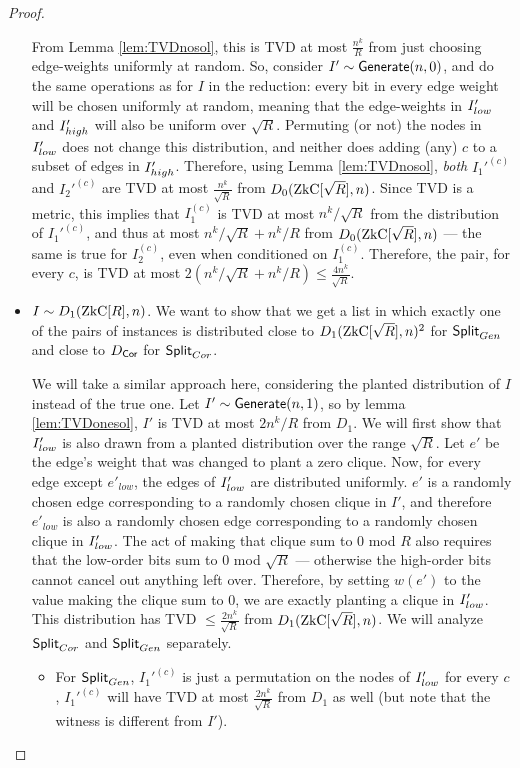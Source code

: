 \begin{proof}
\begin{itemize}
		From Lemma \ref{lem:TVDnosol}, this is TVD at most $\frac {n^k}{R}$ from just choosing edge-weights uniformly at random. So, consider $I' \sim \mathsf{Generate}(n,0)$, and do the same operations as for $I$ in the reduction: every bit in every edge weight will be chosen uniformly at random, meaning that the edge-weights in $I_{low}'$ and $I_{high}'$ will also be uniform over $\sqrt R$. Permuting (or not) the nodes in $I_{low}'$ does not change this distribution, and neither does adding (any) $c$ to a subset of edges in $I_{high}'$. Therefore, using Lemma \ref{lem:TVDnosol}, \emph{both} $I_1'^{(c)}$ and $I_2'^{(c)}$ are TVD at most $\frac{n^k}{\sqrt R}$ from $D_0(\ZkC[\sqrt R], n)$. Since TVD is a metric, this implies that $I_1^{(c)}$ is TVD at most $n^k / \sqrt R$ from the distribution of $I_1'^{(c)}$, and thus at most $n^k / \sqrt R + n^k/ R$ from $D_0(\ZkC[\sqrt R], n)$ --- the same is true for $I_2^{(c)}$, even when conditioned on $I_1^{(c)}$. Therefore, the pair, for every $c$, is TVD at most $2(n^k / \sqrt R + n^k/ R) \le \frac{4 n^k}{\sqrt R}$.
		
		
		\item $I \sim D_1(\ZkC[R], n)$. We want to show that we get a list in which exactly one of the pairs of instances is distributed close to $D_1(\ZkC[\sqrt R], n)^2$ for $\mathsf{Split}_{Gen}$ and close to $D_{\mathsf{Cor}}$ for $\mathsf{Split}_{Cor}$.
		
		We will take a similar approach here, considering the planted distribution of $I$ instead of the true one. Let $I' \sim \mathsf{Generate}(n,1)$, so by lemma \ref{lem:TVDonesol}, $I'$ is TVD at most $2n^k/R$ from $D_1$. We will first show that $I_{low}'$ is also drawn from a planted distribution over the range $\sqrt R$.
		Let $e'$ be the edge's weight that was changed to plant a zero clique. Now, for every edge except $e'_{low}$, the edges of $I_{low}'$ are distributed uniformly. $e'$ is a randomly chosen edge corresponding to a randomly chosen clique in $I'$, and therefore $e'_{low}$ is also a randomly chosen edge corresponding to a randomly chosen clique in $I_{low}'$. The act of making that clique sum to 0 mod $R$ also requires that the low-order bits sum to $0$ mod $\sqrt R$ --- otherwise the high-order bits cannot cancel out anything left over. Therefore, by setting $w(e')$ to the value making the clique sum to 0, we are exactly planting a clique in $I_{low}'$. This distribution has TVD $\le \frac{2n^k}{\sqrt R}$ from $D_1(\ZkC[\sqrt R], n)$. We will analyze $\mathsf{Split}_{Cor}$ and $\mathsf{Split}_{Gen}$ separately.
		
		\begin{itemize}
			\item For $\mathsf{Split}_{Gen}$, $I_1'^{(c)}$ is just a permutation on the nodes of $I_{low}'$ for every $c$, $I_1'^{(c)}$ will have TVD at most $\frac{2n^k}{\sqrt R}$ from $D_1$ as well (but note that the witness is different from $I'$).
			

\end{itemize}
\end{itemize}
\end{proof}
